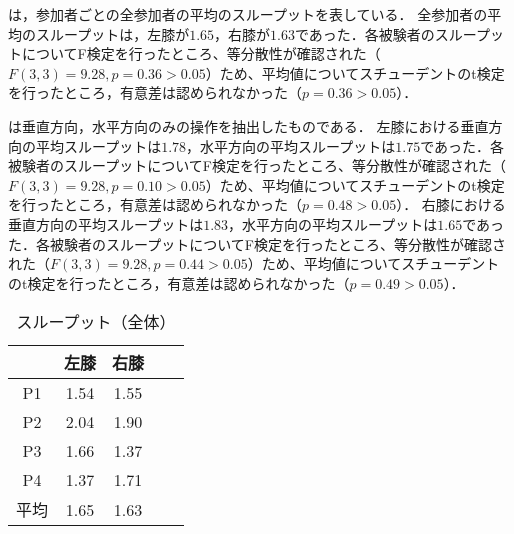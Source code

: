 \documentclass[submit, techrep]{ipsj}
\begin{document}
は，参加者ごとの全参加者の平均のスループットを表している．
全参加者の平均のスループットは，左膝が$1.65$，右膝が$1.63$であった．各被験者のスループットについてF検定を行ったところ、等分散性が確認された（$F(3,3)=9.28, p=0.36>0.05$）ため、平均値についてスチューデントのt検定を行ったところ，有意差は認められなかった（$p=0.36>0.05$）．\par
{}は垂直方向，水平方向のみの操作を抽出したものである．
左膝における垂直方向の平均スループットは$1.78$，水平方向の平均スループットは$1.75$であった．各被験者のスループットについてF検定を行ったところ、等分散性が確認された（$F(3,3)=9.28, p=0.10>0.05$）ため、平均値についてスチューデントのt検定を行ったところ，有意差は認められなかった（$p=0.48>0.05$）．
右膝における垂直方向の平均スループットは$1.83$，水平方向の平均スループットは$1.65$であった．各被験者のスループットについてF検定を行ったところ、等分散性が確認された（$F(3,3)=9.28, p=0.44>0.05$）ため、平均値についてスチューデントのt検定を行ったところ，有意差は認められなかった（$p=0.49>0.05$）．
\begin{table}[tb]
	\begin{center}
		\caption{スループット（全体）}
		\begin{tabular}{|c|c|c|c|c|}
		\hline
 & 左膝 & 右膝 \\ \hline
P1 & 1.54  & 1.55  \\ \hline
P2 & 2.04  & 1.90  \\ \hline
P3 & 1.66  & 1.37  \\ \hline
P4 & 1.37  & 1.71  \\ \hline
平均 & 1.65  & 1.63  \\ \hline
		\end{tabular}
		\label{tb:tp}
	\end{center}
\end{table}
\end{document}
